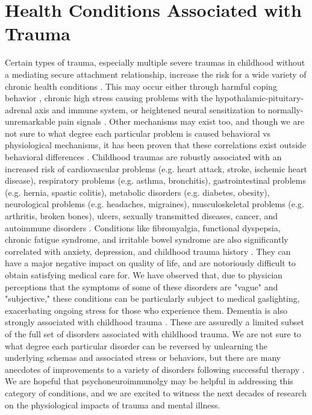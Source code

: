 \documentclass[12pt,letterpaper]{book}
\begin{document}
\section{Health Conditions Associated with Trauma}
Certain types of trauma, especially multiple severe traumas in childhood without a mediating secure attachment relationship, increase the risk for a wide variety of chronic health conditions \cite{harris2018deepest}. This may occur either through harmful coping behavior \cite{felittiACE}, chronic high stress causing problems with the hypothalamic-pituitary-adrenal axis \cite{CSAHealth} and immune system, or heightened neural sensitization to normally-unremarkable pain signals \cite{karimov2024childhood,fitzcharles2021nociplastic}. Other mechanisms may exist too, and though we are not sure to what degree each particular problem is caused behavioral vs physiological mechanisms, it has been proven that these correlations exist outside behavioral differences \cite{felittiACE}. Childhood traumas are robustly associated with an increased risk of cardiovascular problems (e.g. heart attack, stroke, ischemic heart disease), respiratory problems (e.g. asthma, bronchitis), gastrointestinal problems (e.g. hernia, spastic colitis), metabolic disorders (e.g. diabetes, obesity), neurological problems (e.g. headaches, migraines), musculoskeletal problems (e.g. arthritis, broken bones), ulcers, sexually transmitted diseases, cancer, and autoimmune disorders \cite{wegman2009meta,norman2012long,hughes2017effect}. Conditions like fibromyalgia, functional dyspepsia, chronic fatigue syndrome, and irritable bowel syndrome are also significantly correlated with anxiety, depression, and childhood trauma history \cite{henningsenSomatic,gardoki2022prevalence,silvernale2024relationship}. They can have a major negative impact on quality of life, and are notoriously difficult to obtain satisfying medical care for. We have observed that, due to physician perceptions that the symptoms of some of these disorders are "vague" and "subjective," these conditions can be particularly subject to medical gaslighting, exacerbating ongoing stress for those who experience them. Dementia is also strongly associated with childhood trauma \cite{severs2023traumatic}. These are assuredly a limited subset of the full set of disorders associated with childhood trauma. We are not sure to what degree each particular disorder can be reversed by unlearning the underlying schemas and associated stress or behaviors, but there are many anecdotes of improvements to a variety of disorders following successful therapy \cite{vanderKolkBody}. We are hopeful that psychoneuroimmunolgy may be helpful in addressing this category of conditions, and we are excited to witness the next decades of research on the physiological impacts of trauma and mental illness.
\end{document}
